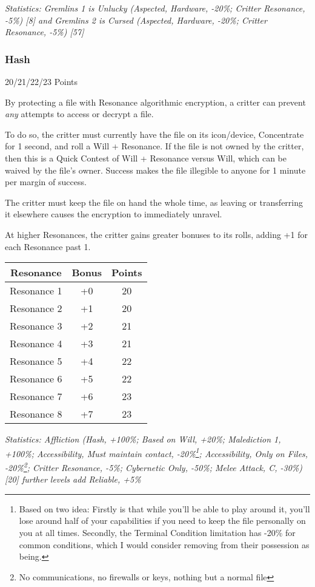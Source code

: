 \begin{multicols*}{3}
	\textcolor{OliveGreen}{\textit{Statistics: Gremlins 1 is Unlucky (Aspected, Hardware, -20\%; Critter Resonance, -5\%) [8] and Gremlins 2 is Cursed (Aspected, Hardware, -20\%; Critter Resonance, -5\%) [57]}}

	\subsubsection{Hash}\label{hash}
	\begin{flushright}
		20/21/22/23 Points
	\end{flushright}

	By protecting a file with Resonance algorithmic encryption, a critter can prevent \textit{any} attempts to access or decrypt a file.
	
	To do so, the critter must currently have the file on its icon/device, Concentrate for 1 second, and roll a Will + Resonance. If the file is not owned by the critter, then this is a Quick Contest of Will + Resonance versus Will, which can be waived by the file's owner. Success makes the file illegible to anyone for 1 minute per margin of success.
	
	The critter must keep the file on hand the whole time, as leaving or transferring it elsewhere causes the encryption to immediately unravel.
	
	At higher Resonances, the critter gains greater bonuses to its rolls, adding +1 for each Resonance past 1.
	
	\begin{center}
		\begin{tabular}{|c|c|c|}
			\hline
			Resonance & Bonus & Points \\
			\hline
			\hline
			Resonance 1 & +0 & 20 \\
			Resonance 2 & +1 & 20 \\
			Resonance 3 & +2 & 21 \\
			Resonance 4 & +3 & 21 \\
			Resonance 5 & +4 & 22 \\
			Resonance 6 & +5 & 22 \\
			Resonance 7 & +6 & 23 \\
			Resonance 8 & +7 & 23 \\
			\hline
		\end{tabular}
	\end{center}

	\textcolor{OliveGreen}{\textit{Statistics: Affliction (Hash, +100\%; Based on Will, +20\%; Malediction 1, +100\%; Accessibility, Must maintain contact, -20\%\footnote{Based on two idea: Firstly is that while you'll be able to play around it, you'll lose around half of your capabilities if you need to keep the file personally on you at all times. Secondly, the Terminal Condition limitation has -20\% for common conditions, which I would consider removing from their possession as being.}; Accessibility, Only on Files, -20\%\footnote{No communications, no firewalls or keys, nothing but a normal file}; Critter Resonance, -5\%; Cybernetic Only, -50\%; Melee Attack, C, -30\%) [20] further levels add Reliable, +5\%}}


\end{multicols*}
